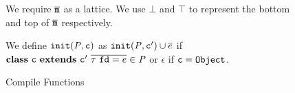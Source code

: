 \begin{figure*}[ht]
\begin{tabularx}{1\linewidth}{>{$}l<{$} >{$}c<{$} >{$}l<{$} >{$}l<{$}}
\end{tabularx}

We require $\overline{\mathtt{m}}$ as a lattice. We use $\bot$ and $\top$ to represent the bottom and top of $\overline{\mathtt{m}}$ respectively.

We define $\mathtt{init}(\mathit{P},\mathtt{c})$ as $\mathtt{init}(\mathit{P},\mathtt{c}') \cup \overline{e}$ if $\kwclass \ \Cname \ \kwextends \ \Cname' \ \overline{\t \ \Fname = e} \in \programcode$ or $\epsilon$ if $\mathtt{c} = \texttt{Object}$.

\nocaptionrule\caption{Compile Functions}
\label{fig:compilefuncs}
\end{figure*}
